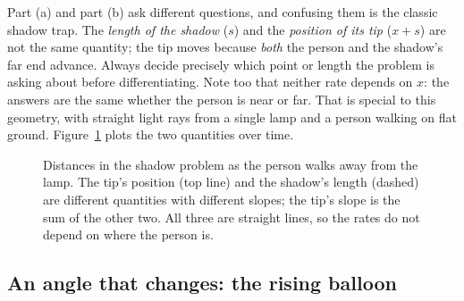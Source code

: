 \begin{trapbox}
Part (a) and part (b) ask different questions, and confusing them is the classic shadow trap. The
\emph{length of the shadow} ($s$) and the \emph{position of its tip} ($x+s$) are not the same
quantity; the tip moves because \emph{both} the person and the shadow's far end advance. Always
decide precisely which point or length the problem is asking about before differentiating. Note
too that neither rate depends on $x$: the answers are the same whether the person is near or far.
That is special to this geometry, with straight light rays from a single lamp and a person walking
on flat ground. Figure~\ref{ch13:fig-shadow-graph} plots the two quantities over time.
\end{trapbox}

\begin{figure}[htbp]
\centering
{}
\caption{Distances in the shadow problem as the person walks away from the lamp. The tip's
position (top line) and the shadow's length (dashed) are different quantities with different
slopes; the tip's slope is the sum of the other two. All three are straight lines, so the rates do
not depend on where the person is.}
\label{ch13:fig-shadow-graph}
\end{figure}

\subsection{An angle that changes: the rising balloon}


